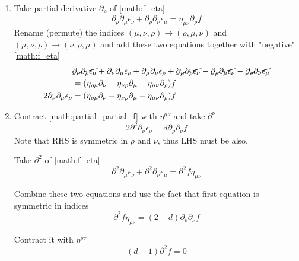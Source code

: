 \begin{enumerate}
	\item Take partial derivative $\partial_\rho$ of \eqref{math:f_eta}
		\begin{equation}
			\partial_\rho \partial_\mu \epsilon_\nu + \partial_\rho \partial_\nu \epsilon_\mu = \eta_{\mu\nu} \partial_\rho f
		\end{equation}
		Rename (permute) the indices $(\mu,\nu,\rho) \rightarrow (\rho,\mu,\nu)$ and $(\mu,\nu,\rho) \rightarrow (\nu,\rho,\mu)$ and add these two equations together with "negative" \eqref{math:f_eta}
		\begin{align}
	&\cancel{\partial_\nu \partial_\rho \epsilon_\mu} + \partial_\nu \partial_\mu \epsilon_\rho
	+	\partial_\mu \partial_\nu \epsilon_\rho + \cancel{\partial_\mu \partial_\rho \epsilon_\nu}
	-\cancel{\partial_\rho \partial_\mu \epsilon_\nu} - \cancel{\partial_\rho \partial_\nu \epsilon_\mu}  \notag \\
	&= ( \eta_{\rho\mu} \partial_\nu +  \eta_{\nu\rho} \partial_\mu -\eta_{\mu\nu} \partial_\rho  )f \notag  \\
			2\partial_\nu \partial_\mu \epsilon_\rho &= ( \eta_{\rho\mu} \partial_\nu +  \eta_{\nu\rho} \partial_\mu -\eta_{\mu\nu} \partial_\rho  )f \label{math:partial_partial_f} 
		\end{align}

	\item Contract \eqref{math:partial_partial_f} with $\eta^{\mu\nu}$ and take $\partial^\nu$
		\begin{equation*}
			2  \partial^2 \partial_\nu \epsilon_\rho = d \partial_\rho\partial_\nu f
		\end{equation*}
		Note that RHS is symmetric in $\rho$ and $\nu$, thus LHS must be also.

		Take $\partial^2$ of \eqref{math:f_eta}
		\begin{equation*}
			\partial^2 \partial_\mu \epsilon_\nu + \partial^2 \partial_\nu \epsilon_\mu  =  \partial^2 f \eta_{\mu\nu}
		\end{equation*}

		Combine these two equations and use the fact that first equation is symmetric in indices
		\begin{equation}
			\partial^2 f \eta_{\rho \nu} = (2-d) \partial_\rho \partial_\nu f
		\end{equation}

		Contract it with $\eta^{\rho \nu}$ 
		\begin{equation}
			(d-1) \partial^2 f = 0
		\end{equation}


\end{enumerate}

